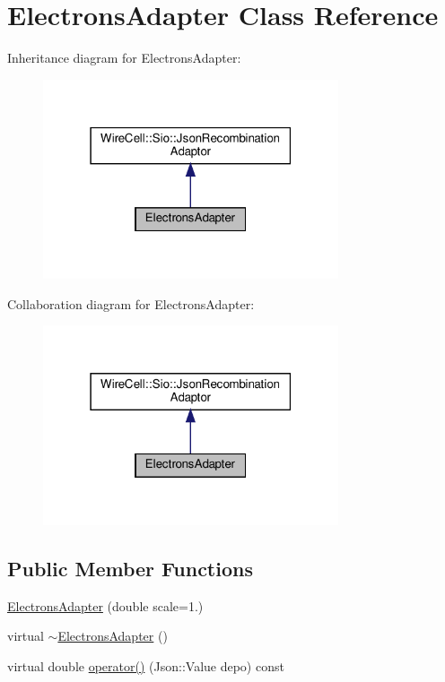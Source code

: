 \hypertarget{class_electrons_adapter}{}\section{Electrons\+Adapter Class Reference}
\label{class_electrons_adapter}


Inheritance diagram for Electrons\+Adapter\+:
\nopagebreak
\begin{figure}[H]
\begin{center}
\leavevmode
\includegraphics[width=247pt]{class_electrons_adapter__inherit__graph}
\end{center}
\end{figure}


Collaboration diagram for Electrons\+Adapter\+:
\nopagebreak
\begin{figure}[H]
\begin{center}
\leavevmode
\includegraphics[width=247pt]{class_electrons_adapter__coll__graph}
\end{center}
\end{figure}
\subsection*{Public Member Functions}
\begin{DoxyCompactItemize}
\item 
\hyperlink{class_electrons_adapter_a2e7e05c3e2b06e8650e44318ae08a39d}{Electrons\+Adapter} (double scale=1.)
\item 
virtual \hyperlink{class_electrons_adapter_ad4b000bc102dfcbf83bf01906aeb1cb3}{$\sim$\+Electrons\+Adapter} ()
\item 
virtual double \hyperlink{class_electrons_adapter_a1480df3bcb8fdfb34608f2397782a7ee}{operator()} (Json\+::\+Value depo) const
\end{DoxyCompactItemize}


